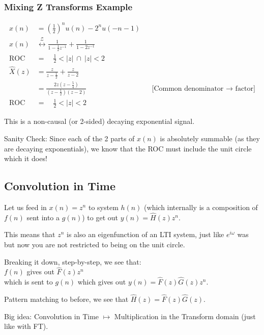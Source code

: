 \subsubsection{Mixing Z Transforms Example}
\begin{align*}
    x(n)
    &=\left(\frac12\right)^n u(n) - 2^nu(-n-1)
    \\
    x(n)
    &\stackrel{\mathcal Z}\leftrightarrow
    \frac1{1-\frac12z^{-1}} + \frac1{1-2z^{-1}}
    \\
    \text{ROC}&=\quad\frac12<|z|\ \cap\ |z|<2
    \\
    \hat X(z)
    &=\frac z{z-\frac12} + \frac z{z-2}
    \\
    &=\frac{2z(z-\frac54)}{(z-\frac12)(z-2)}
    &&\text{[Common denominator $\to$ factor]}
    \\
    \text{ROC}&=\quad\frac12<|z|<2
\end{align*}

This is a non-causal (or 2-sided) decaying exponential signal.

\begin{shaded}
Sanity Check: Since each of the 2 parts of $x(n)$ is absolutely summable (as they are decaying exponentials), we know that the ROC must include the unit circle which it does!
\end{shaded}

\subsection{Convolution in Time}
Let us feed in $x(n)=z^n$ to system $h(n)$ (which internally is a composition of $f(n)$ sent into a $g(n)$) to get out $y(n) =\hat H(z)z^n$.

This means that $z^n$ is also an eigenfunction of an LTI system, just like $e^{i\omega}$ was but now you are not restricted to being on the unit circle.

Breaking it down, step-by-step, we see that:\\
$f(n)$ gives out $\hat F(z)z^n$\\
which is sent to $g(n)$ which gives out $y(n)=\hat F(z)\hat G(z) z^n$.

Pattern matching to before, we see that $\hat H(z)=\hat F(z)\hat G(z)$.

\begin{shaded}
Big idea: Convolution in Time $\mapsto$ Multiplication in the Transform domain (just like with FT).
\end{shaded}

